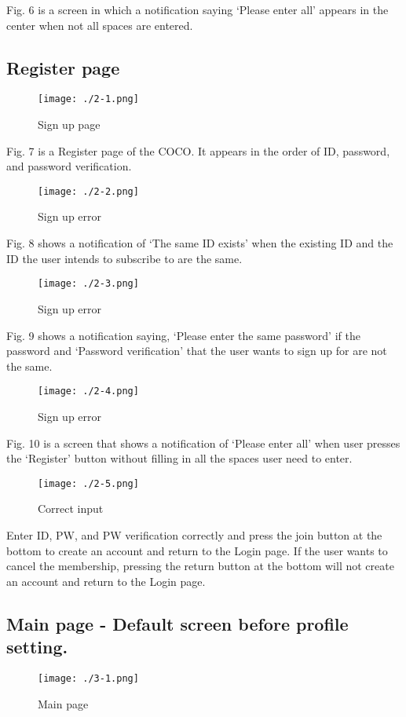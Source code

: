 \documentclass[conference]{IEEEtran}
\begin{document}
Fig. 6 is a screen in which a notification saying ‘Please enter all’ appears in the center when not all spaces are entered.

\subsection{Register page}
\begin{figure}[H]
\texttt{[image: ./2-1.png]}
\centering
\caption{Sign up page}
\end{figure}

Fig. 7 is a Register page of the COCO. It appears in the order of ID, password, and password verification.

\begin{figure}[H]
\texttt{[image: ./2-2.png]}
\centering
\caption{Sign up error}
\end{figure}

Fig. 8 shows a notification of ‘The same ID exists’ when the existing ID and the ID the user intends to subscribe to are the same.

\begin{figure}[H]
\texttt{[image: ./2-3.png]}
\centering
\caption{Sign up error}
\end{figure}

Fig. 9 shows a notification saying, ‘Please enter the same password’ if the password and ‘Password verification’ that the user wants to sign up for are not the same.

\begin{figure}[H]
\texttt{[image: ./2-4.png]}
\centering
\caption{Sign up error}
\end{figure}
Fig. 10 is a screen that shows a notification of ‘Please enter all’ when user presses the ‘Register’ button without filling in all the spaces user need to enter.

\begin{figure}[H]
\texttt{[image: ./2-5.png]}
\centering
\caption{Correct input}
\end{figure}

Enter ID, PW, and PW verification correctly and press the join button at the bottom to create an account and return to the Login page. If the user wants to cancel the membership, pressing the return button at the bottom will not create an account and return to the Login page.

\subsection{Main page - Default screen before profile setting.}
\begin{figure}[H]
\texttt{[image: ./3-1.png]}
\centering
\caption{Main page}
\end{figure}
\end{document}
